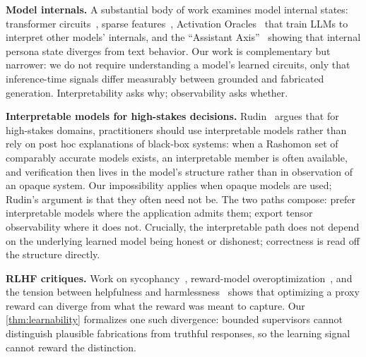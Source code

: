\documentclass[11pt]{article}
\newcommand{\fakepara}[1]{\noindent\textbf{#1}\xspace}
\begin{document}
\fakepara{Model internals.} A substantial body of work examines model internal
states: transformer circuits~\citep{elhage2021mathematical}, sparse
features~\citep{bricken2023monosemanticity}, Activation
Oracles~\citep{karvonen2025activation} that train LLMs to interpret other
models' internals, and the ``Assistant Axis''~\citep{lu2026assistantaxissituatingstabilizing} showing
that internal persona state diverges from text behavior. Our work is
complementary but narrower: we do not require understanding a model's learned
circuits, only that inference-time signals differ measurably between grounded
and fabricated generation. Interpretability asks why; observability asks
whether.

\fakepara{Interpretable models for high-stakes decisions.} Rudin~\citep{rudin2019stop}
argues that for high-stakes domains, practitioners should use interpretable
models rather than rely on post hoc explanations of black-box systems: when a
Rashomon set of comparably accurate models exists, an interpretable member is
often available, and verification then lives in the model's structure rather
than in observation of an opaque system. Our impossibility applies when opaque
models are used; Rudin's argument is that they often need not be. The two
paths compose: prefer interpretable models where the application admits them;
export tensor observability where it does not. Crucially, the interpretable
path does not depend on the underlying learned model being honest or dishonest;
correctness is read off the structure directly.

\fakepara{RLHF critiques.} Work on sycophancy~\citep{perez2022discovering},
reward-model overoptimization~\citep{gao2023scaling}, and the tension between
helpfulness and harmlessness~\citep{bai2022training} shows that optimizing a
proxy reward can diverge from what the reward was meant to capture. Our
\autoref{thm:learnability} formalizes one such divergence: bounded supervisors
cannot distinguish plausible fabrications from truthful responses, so the
learning signal cannot reward the distinction.
\end{document}
